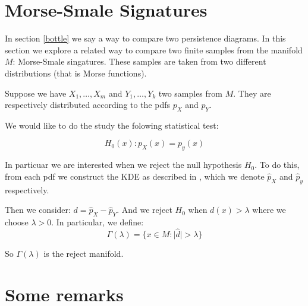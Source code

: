 \section{Morse-Smale Signatures}

In section \ref{bottle} we say a way to compare two persistence diagrams. In this section we explore a related way to compare
two finite samples from the manifold $M$:
Morse-Smale singatures.
These samples are taken from two different distributions (that is Morse functions).

Suppose we have $X_1,\ldots,X_m$ and $Y_1,\ldots,Y_k$ two samples from $M$.  
They are respectively distributed according to the pdfs $p_X$ and $p_Y$.

We would like to do the study the folowing statistical test:

$$
H_0(x):p_X(x)=p_y(x)
$$

In particuar we are interested when we reject the null hypothesis $H_0$.
To do this, from each pdf we construct the KDE as described in \label{kde},
which we denote $\hat p_X$ and $\hat p_y$ respectively.



Then we consider: $d=\hat p_X - \hat p_Y$.
And we reject $H_0$ when $d(x)>\lambda$ where we choose $\lambda>0$.
In particular, we define:
$$
\Gamma(\lambda)=
\{
    x\in M:
    \vert \hat d \vert > \lambda
\}
$$

So $\Gamma(\lambda)$ is the reject manifold.

\section{Some remarks}
